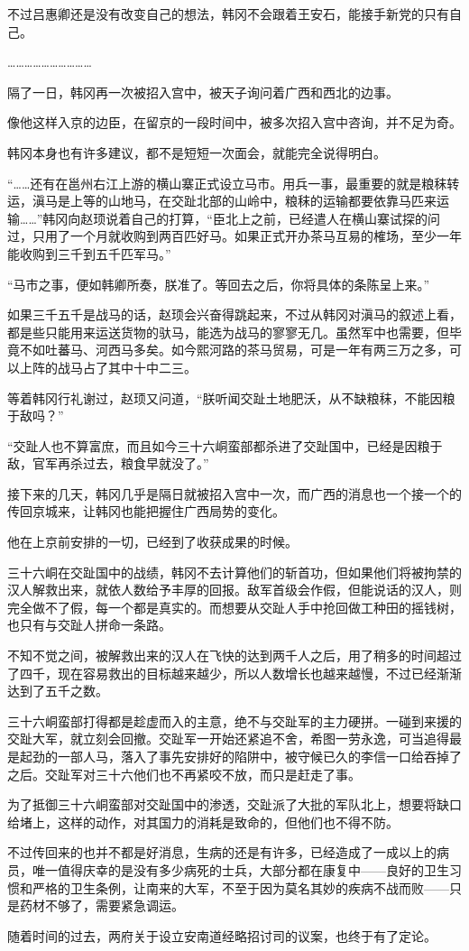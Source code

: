 不过吕惠卿还是没有改变自己的想法，韩冈不会跟着王安石，能接手新党的只有自己。

…………………………

隔了一日，韩冈再一次被招入宫中，被天子询问着广西和西北的边事。

像他这样入京的边臣，在留京的一段时间中，被多次招入宫中咨询，并不足为奇。

韩冈本身也有许多建议，都不是短短一次面会，就能完全说得明白。

“……还有在邕州右江上游的横山寨正式设立马市。用兵一事，最重要的就是粮秣转运，滇马是上等的山地马，在交趾北部的山岭中，粮秣的运输都要依靠马匹来运输……”韩冈向赵顼说着自己的打算，“臣北上之前，已经遣人在横山寨试探的问过，只用了一个月就收购到两百匹好马。如果正式开办茶马互易的榷场，至少一年能收购到三千到五千匹军马。”

“马市之事，便如韩卿所奏，朕准了。等回去之后，你将具体的条陈呈上来。”

如果三千五千是战马的话，赵顼会兴奋得跳起来，不过从韩冈对滇马的叙述上看，都是些只能用来运送货物的驮马，能选为战马的寥寥无几。虽然军中也需要，但毕竟不如吐蕃马、河西马多矣。如今熙河路的茶马贸易，可是一年有两三万之多，可以上阵的战马占了其中十中二三。

等着韩冈行礼谢过，赵顼又问道，“朕听闻交趾土地肥沃，从不缺粮秣，不能因粮于敌吗？”

“交趾人也不算富庶，而且如今三十六峒蛮部都杀进了交趾国中，已经是因粮于敌，官军再杀过去，粮食早就没了。”

接下来的几天，韩冈几乎是隔日就被招入宫中一次，而广西的消息也一个接一个的传回京城来，让韩冈也能把握住广西局势的变化。

他在上京前安排的一切，已经到了收获成果的时候。

三十六峒在交趾国中的战绩，韩冈不去计算他们的斩首功，但如果他们将被拘禁的汉人解救出来，就依人数给予丰厚的回报。敌军首级会作假，但能说话的汉人，则完全做不了假，每一个都是真实的。而想要从交趾人手中抢回做工种田的摇钱树，也只有与交趾人拼命一条路。

不知不觉之间，被解救出来的汉人在飞快的达到两千人之后，用了稍多的时间超过了四千，现在容易救出的目标越来越少，所以人数增长也越来越慢，不过已经渐渐达到了五千之数。

三十六峒蛮部打得都是趁虚而入的主意，绝不与交趾军的主力硬拼。一碰到来援的交趾大军，就立刻会回撤。交趾军一开始还紧追不舍，希图一劳永逸，可当追得最是起劲的一部人马，落入了事先安排好的陷阱中，被守候已久的李信一口给吞掉了之后。交趾军对三十六他们也不再紧咬不放，而只是赶走了事。

为了抵御三十六峒蛮部对交趾国中的渗透，交趾派了大批的军队北上，想要将缺口给堵上，这样的动作，对其国力的消耗是致命的，但他们也不得不防。

不过传回来的也并不都是好消息，生病的还是有许多，已经造成了一成以上的病员，唯一值得庆幸的是没有多少病死的士兵，大部分都在康复中——良好的卫生习惯和严格的卫生条例，让南来的大军，不至于因为莫名其妙的疾病不战而败——只是药材不够了，需要紧急调运。

随着时间的过去，两府关于设立安南道经略招讨司的议案，也终于有了定论。

